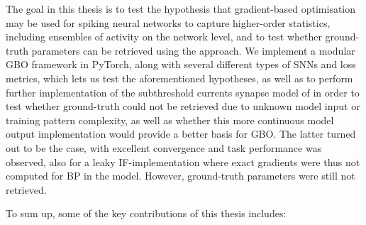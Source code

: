 \documentclass[mphil,deptreport,ianc]{infthesis} %
\begin{document}
The goal in this thesis is to test the hypothesis that gradient-based optimisation may be used for spiking neural networks to capture higher-order statistics, including ensembles of activity on the network level, and to test whether ground-truth parameters can be retrieved using the approach.
We implement a modular GBO framework in PyTorch, along with several different types of SNNs and loss metrics, which lets us test the aforementioned hypotheses, as well as to perform further implementation of the subthreshold currents synapse model of \cite{Huh2017} in order to test whether ground-truth could not be retrieved due to unknown model input or training pattern complexity, as well as whether this more continuous model output implementation would provide a better basis for GBO. The latter turned out to be the case, with excellent convergence and task performance was observed, also for a leaky IF-implementation where exact gradients were thus not computed for BP in the model. However, ground-truth parameters were still not retrieved.

To sum up, some of the key contributions of this thesis includes:
\end{document}
